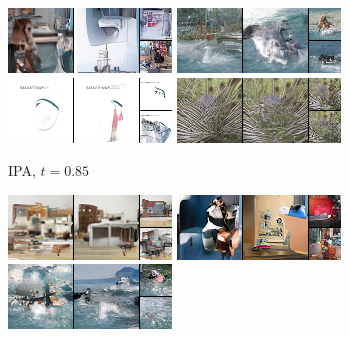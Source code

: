 \begin{figure}[t]
\begin{subfigure}[t]{0.2\textwidth}
      \includegraphics[height=\imagenetimgheight]{figs/cigcvae/image-samples/imagenet64/freeform_aipo_1_t=0.85_samples.png}
      \includegraphics[height=\imagenetimgheight]{figs/cigcvae/image-samples/imagenet64/freeform_aipo_2_t=0.85_samples.png}
      \includegraphics[height=\imagenetimgheight]{figs/cigcvae/image-samples/imagenet64/freeform_aipo_3_t=0.85_samples.png}
      \includegraphics[height=\imagenetimgheight]{figs/cigcvae/image-samples/imagenet64/freeform_aipo_4_t=0.85_samples.png}
      \caption{IPA, $t=0.85$}
    \end{subfigure}
    \begin{subfigure}[t]{0.2\textwidth}
      \centering
      \includegraphics[height=\imagenetimgheight]{figs/cigcvae/image-samples/imagenet64/freeform_aipo_0_samples.png}
      \includegraphics[height=\imagenetimgheight]{figs/cigcvae/image-samples/imagenet64/freeform_aipo_1_samples.png}
      \includegraphics[height=\imagenetimgheight]{figs/cigcvae/image-samples/imagenet64/freeform_aipo_2_samples.png}

\end{subfigure}
\end{figure}
